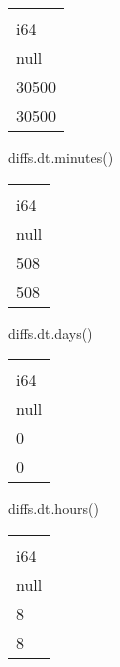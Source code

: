 \documentclass[
  letterpaper,
  DIV=11,
  numbers=noendperiod]{scrartcl}
\newenvironment{Shaded}{\begin{snugshade}}{\end{snugshade}}
\newcommand{\NormalTok}[1]{\textcolor[rgb]{0.00,0.23,0.31}{#1}}
\begin{document}
\begin{longtable}[]{@{}l@{}}
\toprule()
 \\
i64 \\
\midrule()
\endhead
null \\
30500 \\
30500 \\
\bottomrule()
\end{longtable}

\begin{Shaded}
\begin{Highlighting}[]
\NormalTok{diffs.dt.minutes()}
\end{Highlighting}
\end{Shaded}

\begin{longtable}[]{@{}l@{}}
\toprule()
 \\
i64 \\
\midrule()
\endhead
null \\
508 \\
508 \\
\bottomrule()
\end{longtable}

\begin{Shaded}
\begin{Highlighting}[]
\NormalTok{diffs.dt.days()}
\end{Highlighting}
\end{Shaded}

\begin{longtable}[]{@{}l@{}}
\toprule()
 \\
i64 \\
\midrule()
\endhead
null \\
0 \\
0 \\
\bottomrule()
\end{longtable}

\begin{Shaded}
\begin{Highlighting}[]
\NormalTok{diffs.dt.hours()}
\end{Highlighting}
\end{Shaded}

\begin{longtable}[]{@{}l@{}}
\toprule()
 \\
i64 \\
\midrule()
\endhead
null \\
8 \\
8 \\
\bottomrule()
\end{longtable}
\end{document}
